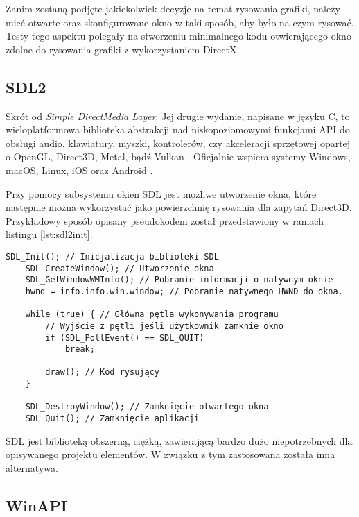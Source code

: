 Zanim zostaną podjęte jakiekolwiek decyzje na temat rysowania grafiki,
należy mieć otwarte oraz skonfigurowane okno w taki sposób, aby było na
czym rysować. Testy tego aspektu polegały na stworzeniu minimalnego kodu otwierającego
okno zdolne do rysowania grafiki z wykorzystaniem DirectX.

\subsection{SDL2}

Skrót od \emph{Simple DirectMedia Layer}. Jej drugie wydanie, napisane w
języku C, to wieloplatformowa biblioteka abstrakcji nad niskopoziomowymi
funkcjami API do obsługi audio, klawiatury, myszki, kontrolerów, czy
akceleracji sprzętowej opartej o OpenGL, Direct3D, Metal, bądź Vulkan
\cite{sdl:wiki:2024}. Oficjalnie wspiera systemy Windows, macOS, Linux, iOS oraz
Android \cite{sdl:wiki:2024}. 

Przy pomocy subsystemu okien SDL jest możliwe utworzenie okna, które
następnie można wykorzystać jako powierzchnię rysowania dla zapytań
Direct3D. Przykładowy sposób opisany pseudokodem został przedstawiony w ramach listingu \ref{lst:sdl2init}.

\vfill

\begin{lstlisting}[caption={Pseudokod inicjalizacji okna SDL2 (oryginalna treść)}, label={lst:sdl2init}]
	SDL_Init(); // Inicjalizacja biblioteki SDL
	SDL_CreateWindow(); // Utworzenie okna
	SDL_GetWindowWMInfo(); // Pobranie informacji o natywnym oknie
	hwnd = info.info.win.window; // Pobranie natywnego HWND do okna.
	
	while (true) { // Główna pętla wykonywania programu
		// Wyjście z pętli jeśli użytkownik zamknie okno
		if (SDL_PollEvent() == SDL_QUIT)
			break;
	
		draw(); // Kod rysujący
	}
		
	SDL_DestroyWindow(); // Zamknięcie otwartego okna
	SDL_Quit(); // Zamknięcie aplikacji
\end{lstlisting}

SDL jest biblioteką obszerną, ciężką, zawierającą bardzo dużo
niepotrzebnych dla opisywanego projektu elementów. W związku z tym
zastosowana została inna alternatywa.

\subsection{WinAPI}

